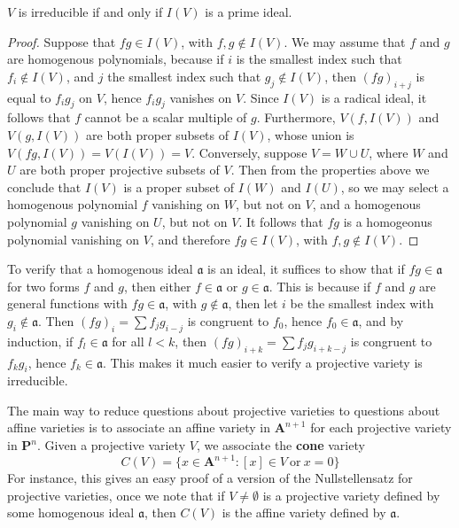 \begin{theorem}
    $V$ is irreducible if and only if $I(V)$ is a prime ideal.
\end{theorem}
\begin{proof}
    Suppose that $fg \in I(V)$, with $f,g \not \in I(V)$. We may assume that $f$ and $g$ are homogenous polynomials, because if $i$ is the smallest index such that $f_i \not \in I(V)$, and $j$ the smallest index such that $g_j \not \in I(V)$, then $(fg)_{i + j}$ is equal to $f_ig_j$ on $V$, hence $f_ig_j$ vanishes on $V$. Since $I(V)$ is a radical ideal, it follows that $f$ cannot be a scalar multiple of $g$. Furthermore, $V(f,I(V))$ and $V(g,I(V))$ are both proper subsets of $I(V)$, whose union is $V(fg,I(V)) = V(I(V)) = V$. Conversely, suppose $V = W \cup U$, where $W$ and $U$ are both proper projective subsets of $V$. Then from the properties above we conclude that $I(V)$ is a proper subset of $I(W)$ and $I(U)$, so we may select a homogenous polynomial $f$ vanishing on $W$, but not on $V$, and a homogenous polynomial $g$ vanishing on $U$, but not on $V$. It follows that $fg$ is a homogeonus polynomial vanishing on $V$, and therefore $fg \in I(V)$, with $f,g \not \in I(V)$.
\end{proof}

To verify that a homogenous ideal $\mathfrak{a}$ is an ideal, it suffices to show that if $fg \in \mathfrak{a}$ for two forms $f$ and $g$, then either $f \in \mathfrak{a}$ or $g \in \mathfrak{a}$. This is because if $f$ and $g$ are general functions with $fg \in \mathfrak{a}$, with $g \not \in \mathfrak{a}$, then let $i$ be the smallest index with $g_i \not \in \mathfrak{a}$. Then $(fg)_i = \sum f_jg_{i-j}$ is congruent to $f_0$, hence $f_0 \in \mathfrak{a}$, and by induction, if $f_l \in \mathfrak{a}$ for all $l < k$, then $(fg)_{i+k} = \sum f_jg_{i+k-j}$ is congruent to $f_kg_i$, hence $f_k \in \mathfrak{a}$. This makes it much easier to verify a projective variety is irreducible.

The main way to reduce questions about projective varieties to questions about affine varieties is to associate an affine variety in $\mathbf{A}^{n+1}$ for each projective variety in $\mathbf{P}^n$. Given a projective variety $V$, we associate the {\bf cone} variety
%
\[ C(V) = \{ x \in \mathbf{A}^{n+1}: [x] \in V\ \text{or}\ x = 0 \} \]
%
For instance, this gives an easy proof of a version of the Nullstellensatz for projective varieties, once we note that if $V \neq \emptyset$ is a projective variety defined by some homogenous ideal $\mathfrak{a}$, then $C(V)$ is the affine variety defined by $\mathfrak{a}$.

